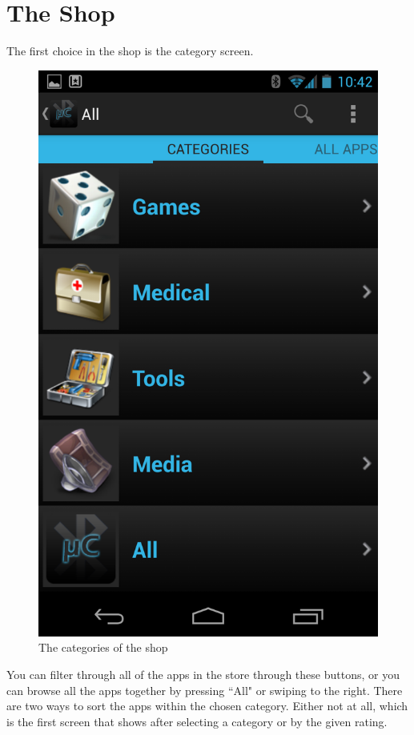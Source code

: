 \chapter{The Shop}
The first choice in the shop is the category screen.\\
\newline
\begin{figure}[H]
	\centering
	\includegraphics[scale = 0.3]{images/Screenshots/category_view.png}
	\caption{The categories of the shop}
\end{figure}
You can filter through all of the apps in the store through these buttons, or you can browse all the apps together by pressing ``All" or swiping to the right. There are two ways to sort the apps within the chosen category. Either not at all, which is the first screen that shows after selecting a category or by the given rating. \\
